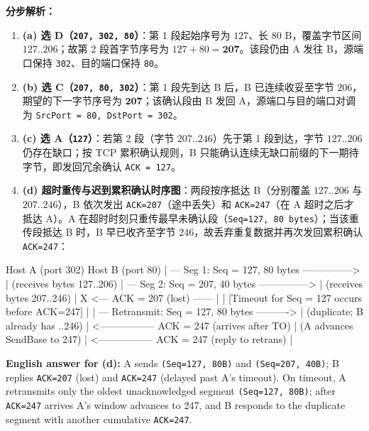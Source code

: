 \textbf{分步解析：}
\begin{enumerate}
\item \textbf{(a) 选 D（\texttt{207, 302, 80}）}：第 1 段起始序号为 $127$、长 $80\text{ B}$，覆盖字节区间 $127..206$；故第 2 段首字节序号为 $127 + 80 = \mathbf{207}$。该段仍由 A 发往 B，源端口保持 \texttt{302}、目的端口保持 \texttt{80}。
\item \textbf{(b) 选 C（\texttt{207, 80, 302}）}：第 1 段先到达 B 后，B 已连续收妥至字节 $206$，期望的下一字节序号为 $\mathbf{207}$；该确认段由 B 发回 A，源端口与目的端口对调为 \texttt{SrcPort = 80, DstPort = 302}。
\item \textbf{(c) 选 A（\texttt{127}）}：若第 2 段（字节 $207..246$）先于第 1 段到达，字节 $127..206$ 仍存在缺口；按 TCP 累积确认规则，B 只能确认连续无缺口前缀的下一期待字节，即发回冗余确认 \texttt{ACK = 127}。
\item \textbf{(d) 超时重传与迟到累积确认时序图}：两段按序抵达 B（分别覆盖 $127..206$ 与 $207..246$），B 依次发出 \texttt{ACK=207}（途中丢失）和 \texttt{ACK=247}（在 A 超时之后才抵达 A）。A 在超时时刻只重传最早未确认段（\texttt{Seq=127, 80 bytes}）；当该重传段抵达 B 时，B 早已收齐至字节 $246$，故丢弃重复数据并再次发回累积确认 \texttt{ACK=247}：
\end{enumerate}

\begin{StudyCode}
Host A (port 302)                                   Host B (port 80)
  | --- Seg 1: Seq = 127, 80 bytes ---------------> |  (receives bytes 127..206)
  | --- Seg 2: Seq = 207, 40 bytes ---------------> |  (receives bytes 207..246)
  |                  X <--- ACK = 207 (lost) ------ |
  |  [Timeout for Seq = 127 occurs before ACK=247]  |
  | --- Retransmit: Seq = 127, 80 bytes ----------> |  (duplicate; B already has ..246)
  | <----------------- ACK = 247 (arrives after TO) |  (A advances SendBase to 247)
  | <----------------- ACK = 247 (reply to retrans) |
\end{StudyCode}

\textbf{English answer for (d):} A sends \texttt{(Seq=127, 80B)} and \texttt{(Seq=207, 40B)}; B replies \texttt{ACK=207} (lost) and \texttt{ACK=247} (delayed past A's timeout). On timeout, A retransmits only the oldest unacknowledged segment \texttt{(Seq=127, 80B)}; after \texttt{ACK=247} arrives A's window advances to 247, and B responds to the duplicate segment with another cumulative \texttt{ACK=247}.



